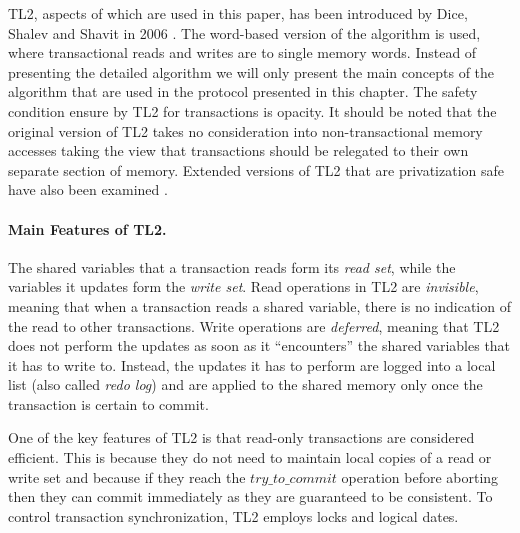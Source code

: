TL2, aspects of which are used in this paper, has been introduced by Dice, Shalev and Shavit in 2006 \cite{DSS06}.
The word-based version of the algorithm is used, %
where transactional reads and writes are to single memory words.
Instead of presenting the detailed algorithm we will only present the main concepts of the algorithm
that are used in the protocol presented in this chapter.
The safety condition ensure by TL2 for transactions is opacity.
It should be noted that the original version of TL2 takes no consideration into non-transactional memory
accesses taking the view that transactions should be relegated to their own separate section of memory.
Extended versions of TL2 that are privatization safe have also been examined \cite{DSS10}.
\paragraph{Main Features of TL2.} The shared variables  that a  transaction reads form its {\it read
set}, while the variables it updates form the {\it write set}. 
Read operations in TL2 are {\it invisible},  meaning  that when  a  transaction reads  a  shared 
variable,  there is no indication of the read to other transactions.  Write operations are  
{\it deferred}, meaning that  TL2 does not perform the updates  as soon as  it {}``encounters'' 
the shared  variables that  it has to write to. Instead, the 
updates it has to perform are logged into a local list (also called {\it redo log}) and   are  applied 
to the shared  memory only once the transaction is certain  to commit.

One of the key features of TL2 is that read-only transactions are considered efficient.
This is because they do not need to maintain 
local copies of a read or write set  and because if they reach the $try\_to\_commit$
operation before aborting then they can commit immediately as they are guaranteed
to be consistent.
To control transaction synchronization, TL2 employs locks and logical dates. 



